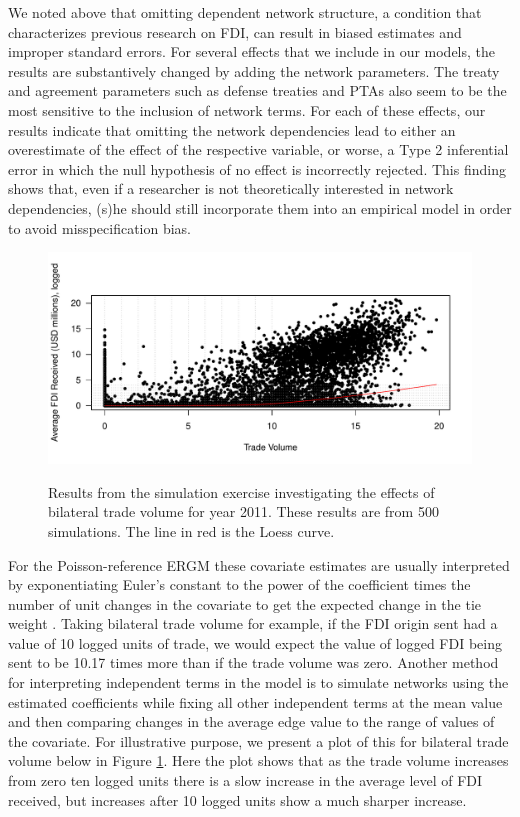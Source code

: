 \documentclass[reqno,onecolumn,letterpaper,12pt]{article}
\begin{document}
We noted above that omitting dependent network structure, a condition that characterizes previous research on FDI, can result in biased estimates and improper standard errors. For several effects that we include in our models, the results are substantively changed by adding the network parameters. The treaty and agreement parameters such as defense treaties and PTAs also seem to be the most sensitive to the inclusion of network terms. For each of these effects, our results indicate that omitting the network dependencies lead to either an overestimate of the effect of the respective variable, or worse, a Type 2 inferential error in which the null hypothesis of no effect is incorrectly rejected. This finding shows that, even if a researcher is not theoretically interested in network dependencies, (s)he should still incorporate them into an empirical model in order to avoid misspecification bias.

\begin{figure}[!h]
\centering
\includegraphics[scale=.75]{./figures/tradevol_sims} \vspace{-.5cm}\\
\caption{\label{fig:tradevol} Results from the simulation exercise investigating the effects of bilateral trade volume  for year 2011. These results are from 500 simulations. The line in red is the Loess curve.}
\end{figure}

For the Poisson-reference ERGM these covariate estimates are usually interpreted by exponentiating Euler's constant to the power of the coefficient times the number of unit changes in the covariate to get the expected change in the tie weight \citep{krivitsky2013modeling}. Taking bilateral trade volume for example, if the FDI origin sent had a value of 10 logged units of trade, we would expect the value of logged FDI being sent to be 10.17 times more than if the trade volume was zero. Another method for interpreting independent terms in the model is to simulate networks using the estimated coefficients while fixing all other independent terms at the mean value and then comparing changes in the average edge value to the range of values of the covariate. For illustrative purpose, we present a plot of this for bilateral trade volume below in Figure \ref{fig:tradevol}. Here the plot shows that as the trade volume increases from zero ten logged units there is a slow increase in the average level of FDI received, but increases after 10 logged units show a much sharper increase.
\end{document}
